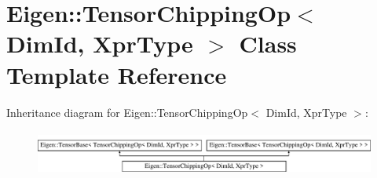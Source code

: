 \hypertarget{class_eigen_1_1_tensor_chipping_op}{}\section{Eigen\+:\+:Tensor\+Chipping\+Op$<$ Dim\+Id, Xpr\+Type $>$ Class Template Reference}
\label{class_eigen_1_1_tensor_chipping_op}
Inheritance diagram for Eigen\+:\+:Tensor\+Chipping\+Op$<$ Dim\+Id, Xpr\+Type $>$\+:\begin{figure}[H]
\begin{center}
\leavevmode
\includegraphics[height=1.521739cm]{class_eigen_1_1_tensor_chipping_op}
\end{center}
\end{figure}
